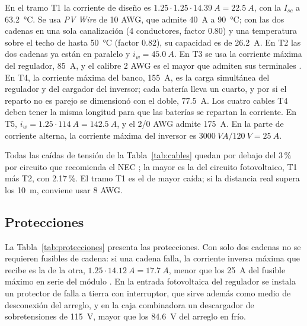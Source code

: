 En el tramo T1 la corriente de diseño es $1.25\cdot1.25\cdot\SI{14.39}{A}=\SI{22.5}{A}$, con la $I_{sc}$ a \SI{63.2}{\celsius}. Se usa \textit{PV Wire} de 10 AWG, que admite \SI{40}{A} a \SI{90}{\celsius}; con las dos cadenas en una sola canalización (4 conductores, factor 0.80) y una temperatura sobre el techo de hasta \SI{50}{\celsius} (factor 0.82), su capacidad es de \SI{26.2}{A}. En T2 las dos cadenas ya están en paralelo y $i_w=\SI{45.0}{A}$. En T3 se usa la corriente máxima del regulador, \SI{85}{A}, y el calibre 2 AWG es el mayor que admiten sus terminales \cite{victron_mppt}. En T4, la corriente máxima del banco, \SI{155}{A}, es la carga simultánea del regulador y del cargador del inversor; cada batería lleva un cuarto, y por si el reparto no es parejo se dimensionó con el doble, \SI{77.5}{A}. Los cuatro cables T4 deben tener la misma longitud para que las baterías se repartan la corriente. En T5, $i_w=1.25\cdot\SI{114}{A}=\SI{142.5}{A}$, y el 2/0 AWG admite \SI{175}{A}. En la parte de corriente alterna, la corriente máxima del inversor es $\SI{3000}{VA}/\SI{120}{V}=\SI{25}{A}$.

Todas las caídas de tensión de la Tabla~\ref{tab:cables} quedan por debajo del 3\,\% por circuito que recomienda el NEC \cite{nec2014}; la mayor es la del circuito fotovoltaico, T1 más T2, con 2.17\,\%. El tramo T1 es el de mayor caída; si la distancia real supera los \SI{10}{m}, conviene usar 8 AWG.

\subsection{Protecciones}

La Tabla~\ref{tab:protecciones} presenta las protecciones. Con solo dos cadenas no se requieren fusibles de cadena: si una cadena falla, la corriente inversa máxima que recibe es la de la otra, $1.25\cdot\SI{14.12}{A}=\SI{17.7}{A}$, menor que los \SI{25}{A} del fusible máximo en serie del módulo \cite{aiko_ds, nec2014}. En la entrada fotovoltaica del regulador se instala un protector de falla a tierra con interruptor, que sirve además como medio de desconexión del arreglo, y en la caja combinadora un descargador de sobretensiones de \SI{115}{V}, mayor que los \SI{84.6}{V} del arreglo en frío.

